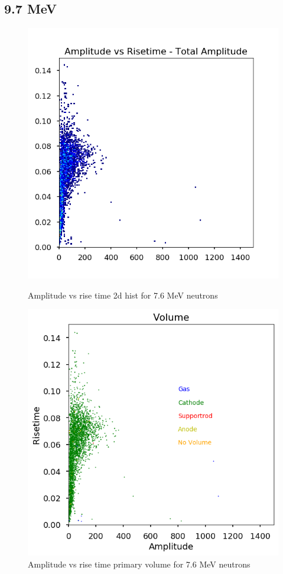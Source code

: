 \documentclass[a4paper]{article}
\begin{document}
\subsection{9.7 MeV}
\begin{figure}[H]
    \centering
    \begin{minipage}{.5\textwidth}
        \centering
        \includegraphics[width=1\linewidth]{Fast/steel_achinos-2d_fast-6.png}
        \caption{Amplitude vs rise time 2d hist for 7.6 MeV neutrons}
        \label{fig:prob1_6_2}
    \end{minipage}%
    \begin{minipage}{0.5\textwidth}
        \centering
        \includegraphics[width=1\linewidth]{Fast/steel_achinos_vol_38_fast-6.png}
        \caption{Amplitude vs rise time primary volume for 7.6 MeV neutrons}
        \label{fig:prob1_6_1}
    \end{minipage}
\end{figure}
\end{document}
